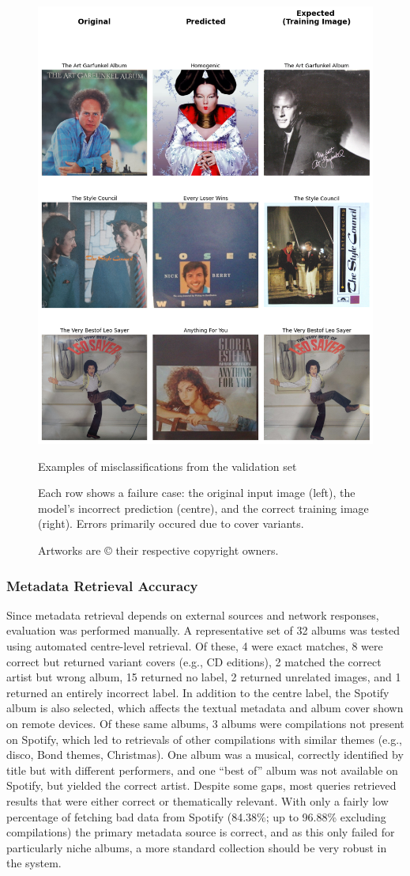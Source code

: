                 \begin{figure}
                    \centering
                    \includegraphics[width=0.5\linewidth]{images/modelEval.png}
                    \caption{Examples of misclassifications from the validation set}
                    \caption*{
                        Each row shows a failure case: the original input image (left), the model’s incorrect prediction (centre), and the correct training image (right). Errors primarily occured due to cover variants.
                    }
                    \caption*{
                        Artworks are © their respective copyright owners.
                    }
                    \label{fig:ModelEval}
                \end{figure}
    
            \subsubsection{Metadata Retrieval Accuracy}
    
                Since metadata retrieval depends on external sources and network responses, evaluation was performed manually. A representative set of 32 albums was tested using automated centre-level retrieval. Of these, 4 were exact matches, 8 were correct but returned variant covers (e.g., CD editions), 2 matched the correct artist but wrong album, 15 returned no label, 2 returned unrelated images, and 1 returned an entirely incorrect label. In addition to the centre label, the Spotify album is also selected, which affects the textual metadata and album cover shown on remote devices. Of these same albums, 3 albums were compilations not present on Spotify, which led to retrievals of other compilations with similar themes (e.g., disco, Bond themes, Christmas). One album was a musical, correctly identified by title but with different performers, and one “best of” album was not available on Spotify, but yielded the correct artist. Despite some gaps, most queries retrieved results that were either correct or thematically relevant. With only a fairly low percentage of fetching bad data from Spotify (84.38\%; up to 96.88\% excluding compilations) the primary metadata source is correct, and as this only failed for particularly niche albums, a more standard collection should be very robust in the system.
    
